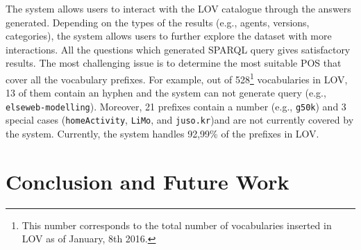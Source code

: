 \documentclass[runningheads,a4paper]{llncs}
\newcommand{\todo}[1]{\noindent\textcolor{red}{{\bf \{TODO}: #1{\bf \}}}}
\begin{document}
The system allows users to interact with the LOV catalogue through the answers generated. Depending on the types of the results (e.g., agents, versions, categories), the system allows users to further explore the dataset with more interactions.
All the questions which generated SPARQL query gives satisfactory results. The most challenging issue is to determine the most suitable POS that cover all the vocabulary prefixes. For example, out of 528\footnote{This number corresponds to the total number of vocabularies inserted in LOV as of January, 8th 2016.} vocabularies in LOV, 13 of them contain an hyphen and the system can not generate query (e.g., \texttt{elseweb-modelling}). Moreover, 21 prefixes contain a number (e.g., \texttt{g50k}) and 3 special cases (\texttt{homeActivity}, \texttt{LiMo}, and \texttt{juso.kr})and are not currently covered by the system. Currently, the system handles 92,99\% of the prefixes in LOV.








\section{Conclusion and Future Work}
\label{sec:conclusion}
%
\end{document}
